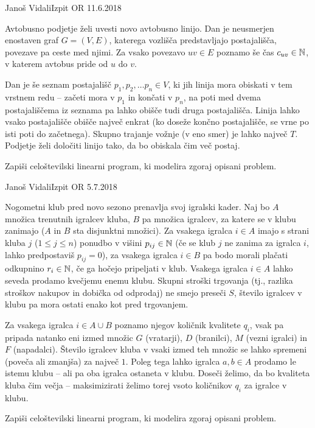 \begin{naloga}{Janoš Vidali}{Izpit OR 11.6.2018}
\begin{vprasanje}
Avtobusno podjetje želi uvesti novo avtobusno linijo.
Dan je neusmerjen enostaven graf $G = (V, E)$,
katerega vozlišča predstavljajo postajališča,
povezave pa ceste med njimi.
Za vsako povezavo $uv \in E$ poznamo še čas $c_{uv} \in \mathbb{N}$,
v katerem avtobus pride od $u$ do $v$.

Dan je še seznam postajališč $p_1, p_2, \dots p_n \in V$,
ki jih linija mora obiskati v tem vrstnem redu
-- začeti mora v $p_1$ in končati v $p_n$,
na poti med dvema postajališčema iz seznama
pa lahko obišče tudi druga postajališča.
Linija lahko vsako postajališče obišče največ enkrat
(ko doseže končno postajališče, se vrne po isti poti do začetnega).
Skupno trajanje vožnje (v eno smer) je lahko največ $T$.
Podjetje želi določiti linijo tako, da bo obiskala čim več postaj.

Zapiši celoštevilski linearni program, ki modelira zgoraj opisani problem.
\end{vprasanje}
\begin{odgovor}
\end{odgovor}
\end{naloga}


\begin{naloga}{Janoš Vidali}{Izpit OR 5.7.2018}
\begin{vprasanje}
Nogometni klub pred novo sezono prenavlja svoj igralski kader.
Naj bo $A$ množica trenutnih igralcev kluba,
$B$ pa množica igralcev, za katere se v klubu zanimajo
($A$ in $B$ sta disjunktni množici).
Za vsakega igralca $i \in A$ imajo s strani kluba $j$ ($1 \le j \le n$)
ponudbo v višini $p_{ij} \in \mathbb{N}$
(če se klub $j$ ne zanima za igralca $i$, lahko predpostaviš $p_{ij} = 0$),
za vsakega igralca $i \in B$ pa bodo morali plačati odkupnino $r_i \in \mathbb{N}$,
če ga hočejo pripeljati v klub.
Vsakega igralca $i \in A$ lahko seveda prodamo kvečjemu enemu klubu.
Skupni stroški trgovanja
(tj., razlika stroškov nakupov in dobička od odprodaj)
ne smejo preseči $S$,
število igralcev v klubu pa mora ostati enako kot pred trgovanjem.

Za vsakega igralca $i \in A \cup B$ poznamo njegov količnik kvalitete $q_i$,
vsak pa pripada natanko eni izmed množic
$G$ (vratarji), $D$ (branilci), $M$ (vezni igralci) in $F$ (napadalci).
Število igralcev kluba v vsaki izmed teh množic se lahko spremeni
(poveča ali zmanjša) za največ $1$.
Poleg tega lahko igralca $a, b \in A$ prodamo le istemu klubu
-- ali pa oba igralca ostaneta v klubu.
Doseči želimo, da bo kvaliteta kluba čim večja
-- maksimizirati želimo torej vsoto količnikov $q_i$ za igralce v klubu.

Zapiši celoštevilski linearni program, ki modelira zgoraj opisani problem.
\end{vprasanje}
\begin{odgovor}
\end{odgovor}
\end{naloga}


